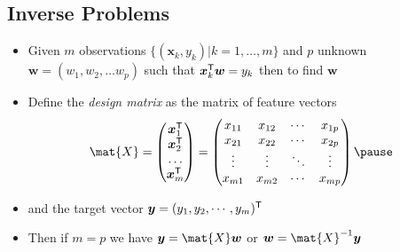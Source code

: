 \documentclass[25pt,landscape,footrule]{foils}
\begin{document}
\begin{slide}
\section{Inverse Problems}

\begin{PauseHighLight}
  \begin{itemize}
  \item Given $m$ observations $\{(\bm{x}_k, y_k)| k=1,\ldots,m\}$ and
    $p$ unknown $\bm{w}=(w_1,w_2, \ldots w_p)$ such that
    $\bm{x}_k^{\textsf{T}} \bm{w} = y_k$ then to find $\bm{w}$\pause
\item Define the \textit{design matrix} as the matrix of feature vectors
  \begin{displaymath}
    \mat{X} = 
    \begin{pmatrix}
      \bm{x}_1^\tr \\ \bm{x}_2^\tr \\ \hdots \\ \bm{x}_m^\tr
    \end{pmatrix} =
    \begin{pmatrix}
      x_{11} & x_{12} & \cdots & x_{1p}\\
      x_{21} & x_{22} & \cdots & x_{2p}\\
      \vdots & \vdots & \ddots & \vdots \\
      x_{m1} & x_{m2} & \cdots & x_{mp}
    \end{pmatrix}\pause
  \end{displaymath}
\item and the target vector $\bm{y} = (y_1, y_2, \cdots, y_m)^{\textsf{T}}$\pause
\item Then if $m=p$ we have $\bm{y} = \mat{X} \bm{w}$ or $\bm{w} =
  \mat{X}^{-1} \bm{y}$\pause
\end{itemize}

\end{PauseHighLight}
\end{slide}

\end{document}

